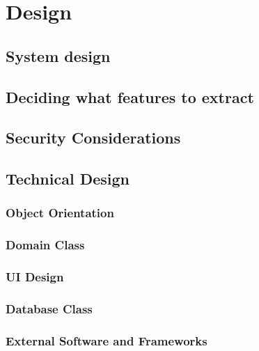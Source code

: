 \chapter{Design}

\begin{comment}
Chapter 3: Design
This chapter starts to describe the student's own work. It is where the main design aspects of the project are described. The style of presentation may reflect the life cycle of the project, for example commencing with the Requirements Analysis, but it should not read like a diary. The design should be clearly and precisely described with supporting diagrams. The presentation should be at a fairly high level without excessive detail. This chapter is a suitable place to justify your choice of architecture, implementation technologies and APIs used.
\end{comment}


\section{System design}

\section{Deciding what features to extract}

\section{Security Considerations}

\section{Technical Design}

\subsection{Object Orientation}

\subsection{Domain Class}

\subsection{UI Design}

\subsection{Database Class}

\subsection{External Software and Frameworks}
